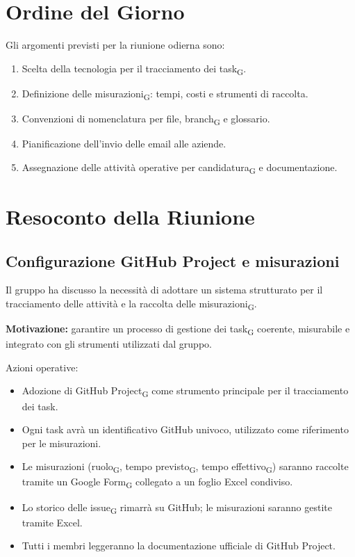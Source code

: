 \section{Ordine del Giorno}
Gli argomenti previsti per la riunione odierna sono:
\begin{enumerate}
    \item Scelta della tecnologia per il tracciamento dei task\textsubscript{G}.
    \item Definizione delle misurazioni\textsubscript{G}: tempi, costi e strumenti di raccolta.
    \item Convenzioni di nomenclatura per file, branch\textsubscript{G} e glossario.
    \item Pianificazione dell’invio delle email alle aziende.
    \item Assegnazione delle attività operative per candidatura\textsubscript{G} e documentazione.
\end{enumerate}

\section{Resoconto della Riunione}

\subsection{Configurazione GitHub Project e misurazioni}
Il gruppo ha discusso la necessità di adottare un sistema strutturato per il tracciamento delle attività e la raccolta delle misurazioni\textsubscript{G}.

\textbf{Motivazione:} garantire un processo di gestione dei task\textsubscript{G} coerente, misurabile e integrato con gli strumenti utilizzati dal gruppo.

Azioni operative:
\begin{itemize}
    \item Adozione di GitHub Project\textsubscript{G} come strumento principale per il tracciamento dei task.
    \item Ogni task avrà un identificativo GitHub univoco, utilizzato come riferimento per le misurazioni.
    \item Le misurazioni (ruolo\textsubscript{G}, tempo previsto\textsubscript{G}, tempo effettivo\textsubscript{G}) saranno raccolte tramite un Google Form\textsubscript{G} collegato a un foglio Excel condiviso.
    \item Lo storico delle issue\textsubscript{G} rimarrà su GitHub; le misurazioni saranno gestite tramite Excel.
    \item Tutti i membri leggeranno la documentazione ufficiale di GitHub Project.
\end{itemize}

